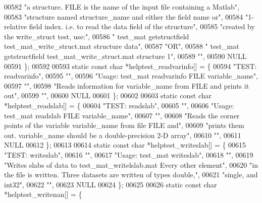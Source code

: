 \begin{DoxyCode}
{{00582     \textcolor{stringliteral}{"a structure. FILE is the name of the input file containing a Matlab"},
00583     \textcolor{stringliteral}{"structure named structure\_name and either the field name or"},
00584     \textcolor{stringliteral}{"1-relative field index. i.e. to read the data field of the structure"},
00585     \textcolor{stringliteral}{"created by the write\_struct test, use:"},
00586     \textcolor{stringliteral}{"  test\_mat getstructfield test\_mat\_write\_struct.mat structure data"},
00587     \textcolor{stringliteral}{"OR"},
00588     \textcolor{stringliteral}{"  test\_mat getstructfield test\_mat\_write\_struct.mat structure 1"},
00589     \textcolor{stringliteral}{""},
00590     NULL
00591 \};
00592 
00593 \textcolor{keyword}{static} \textcolor{keyword}{const} \textcolor{keywordtype}{char} *helptest\_readvarinfo[] = \{
00594     \textcolor{stringliteral}{"TEST: readvarinfo"},
00595     \textcolor{stringliteral}{""},
00596     \textcolor{stringliteral}{"Usage: test\_mat readvarinfo FILE variable\_name"},
00597     \textcolor{stringliteral}{""},
00598     \textcolor{stringliteral}{"Reads information for variable\_name from FILE and prints it out"},
00599     \textcolor{stringliteral}{""},
00600     NULL
00601 \};
00602 
00603 \textcolor{keyword}{static} \textcolor{keyword}{const} \textcolor{keywordtype}{char} *helptest\_readslab[] = \{
00604     \textcolor{stringliteral}{"TEST: readslab"},
00605     \textcolor{stringliteral}{""},
00606     \textcolor{stringliteral}{"Usage: test\_mat readslab FILE variable\_name"},
00607     \textcolor{stringliteral}{""},
00608     \textcolor{stringliteral}{"Reads the corner points of the variable variable\_name from file FILE and"},
00609     \textcolor{stringliteral}{"prints them out.  variable\_name should be a double-precision 2-D array"},
00610     \textcolor{stringliteral}{""},
00611     NULL
00612 \};
00613 
00614 \textcolor{keyword}{static} \textcolor{keyword}{const} \textcolor{keywordtype}{char} *helptest\_writeslab[] = \{
00615     \textcolor{stringliteral}{"TEST: writeslab"},
00616     \textcolor{stringliteral}{""},
00617     \textcolor{stringliteral}{"Usage: test\_mat writeslab"},
00618     \textcolor{stringliteral}{""},
00619     \textcolor{stringliteral}{"Writes slabs of data to test\_mat\_writelslab.mat  Every other element"},
00620     \textcolor{stringliteral}{"in the file is written.  Three datasets are written of types double,"},
00621     \textcolor{stringliteral}{"single, and int32"},
00622     \textcolor{stringliteral}{""},
00623     NULL
00624 \};
00625 
00626 \textcolor{keyword}{static} \textcolor{keyword}{const} \textcolor{keywordtype}{char} *helptest\_writenan[] = \{
}}
\end{DoxyCode}
